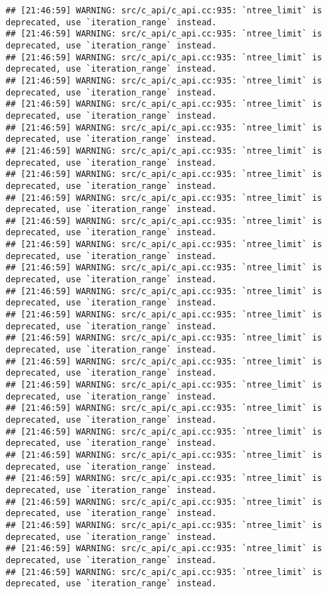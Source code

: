 \documentclass[
]{article}
\begin{document}
\begin{verbatim}
## [21:46:59] WARNING: src/c_api/c_api.cc:935: `ntree_limit` is deprecated, use `iteration_range` instead.
## [21:46:59] WARNING: src/c_api/c_api.cc:935: `ntree_limit` is deprecated, use `iteration_range` instead.
## [21:46:59] WARNING: src/c_api/c_api.cc:935: `ntree_limit` is deprecated, use `iteration_range` instead.
## [21:46:59] WARNING: src/c_api/c_api.cc:935: `ntree_limit` is deprecated, use `iteration_range` instead.
## [21:46:59] WARNING: src/c_api/c_api.cc:935: `ntree_limit` is deprecated, use `iteration_range` instead.
## [21:46:59] WARNING: src/c_api/c_api.cc:935: `ntree_limit` is deprecated, use `iteration_range` instead.
## [21:46:59] WARNING: src/c_api/c_api.cc:935: `ntree_limit` is deprecated, use `iteration_range` instead.
## [21:46:59] WARNING: src/c_api/c_api.cc:935: `ntree_limit` is deprecated, use `iteration_range` instead.
## [21:46:59] WARNING: src/c_api/c_api.cc:935: `ntree_limit` is deprecated, use `iteration_range` instead.
## [21:46:59] WARNING: src/c_api/c_api.cc:935: `ntree_limit` is deprecated, use `iteration_range` instead.
## [21:46:59] WARNING: src/c_api/c_api.cc:935: `ntree_limit` is deprecated, use `iteration_range` instead.
## [21:46:59] WARNING: src/c_api/c_api.cc:935: `ntree_limit` is deprecated, use `iteration_range` instead.
## [21:46:59] WARNING: src/c_api/c_api.cc:935: `ntree_limit` is deprecated, use `iteration_range` instead.
## [21:46:59] WARNING: src/c_api/c_api.cc:935: `ntree_limit` is deprecated, use `iteration_range` instead.
## [21:46:59] WARNING: src/c_api/c_api.cc:935: `ntree_limit` is deprecated, use `iteration_range` instead.
## [21:46:59] WARNING: src/c_api/c_api.cc:935: `ntree_limit` is deprecated, use `iteration_range` instead.
## [21:46:59] WARNING: src/c_api/c_api.cc:935: `ntree_limit` is deprecated, use `iteration_range` instead.
## [21:46:59] WARNING: src/c_api/c_api.cc:935: `ntree_limit` is deprecated, use `iteration_range` instead.
## [21:46:59] WARNING: src/c_api/c_api.cc:935: `ntree_limit` is deprecated, use `iteration_range` instead.
## [21:46:59] WARNING: src/c_api/c_api.cc:935: `ntree_limit` is deprecated, use `iteration_range` instead.
## [21:46:59] WARNING: src/c_api/c_api.cc:935: `ntree_limit` is deprecated, use `iteration_range` instead.
## [21:46:59] WARNING: src/c_api/c_api.cc:935: `ntree_limit` is deprecated, use `iteration_range` instead.
## [21:46:59] WARNING: src/c_api/c_api.cc:935: `ntree_limit` is deprecated, use `iteration_range` instead.
## [21:46:59] WARNING: src/c_api/c_api.cc:935: `ntree_limit` is deprecated, use `iteration_range` instead.
## [21:46:59] WARNING: src/c_api/c_api.cc:935: `ntree_limit` is deprecated, use `iteration_range` instead.

\end{verbatim}
\end{document}
